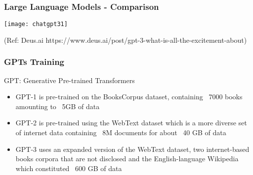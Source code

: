 \begin{frame}[fragile]\frametitle{Large Language Models - Comparison}

\begin{center}
\texttt{[image: chatgpt31]}
\end{center}				
{\tiny (Ref: Deus.ai https://www.deus.ai/post/gpt-3-what-is-all-the-excitement-about)}

\end{frame}


\begin{frame}[fragile]\frametitle{GPTs Training}

GPT: Generative Pre-trained Transformers

\begin{itemize}
\item GPT-1 is pre-trained on the BooksCorpus dataset, containing ~7000 books amounting to ~5GB of data
\item GPT-2 is pre-trained using the WebText dataset which is a more diverse set of internet data containing ~8M documents for about ~40 GB of data
\item GPT-3 uses an expanded version of the WebText dataset, two internet-based books corpora that are not disclosed and the English-language Wikipedia which constituted ~600 GB of data
\end{itemize}	 

\end{frame}


